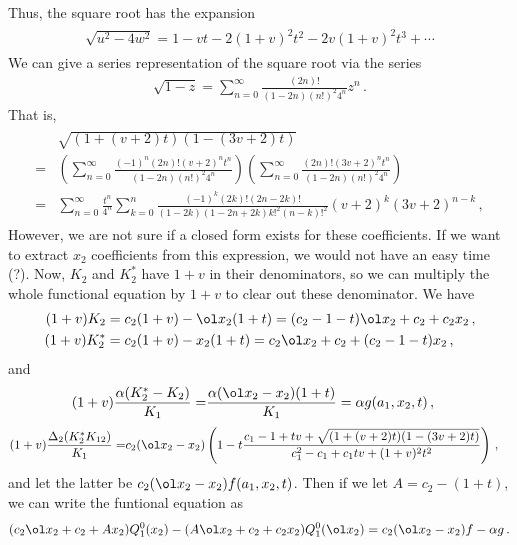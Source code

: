 Thus, the square root has the expansion
\begin{align}
\begin{split}
	\sqrt{u^2-4w^2} = 1 - vt-2(1+v)^2 t^2-2v(1+v)^2t^3+\cdots
\end{split}
\end{align}
We can give a series representation of the square root via the series
\begin{align}
	\sqrt{1-z} = \sum_{n=0}^\infty \frac{(2n)!}{(1-2n)(n!)^2 4^n}z^n\,.
\end{align}
That is,
\begin{align}
\begin{split}
	&\sqrt{(1+(v+2)t)(1-(3v+2)t)} \\=& \left(\sum_{n=0}^\infty \frac{(-1)^n(2n)!(v+2)^n t^n}{(1-2n)(n!)^2 4^n}\right)\left(\sum_{n=0}^\infty \frac{(2n)!(3v+2)^nt^n}{(1-2n)(n!)^2 4^n}\right)\\
	=& \sum_{n=0}^\infty \frac{t^n}{4^n}\sum_{k=0}^n \frac{(-1)^k(2k)!(2n-2k)!}{(1-2k)(1-2n+2k)k!^2 (n-k)!^2}(v+2)^k(3v+2)^{n-k}\,,
\end{split}
\end{align}
However, we are not sure if a closed form exists for these coefficients. If we want to extract $x_2$ coefficients from this expression, we would not have an easy time (?). Now, $K_2$ and $K_2^\ast$ have $1+v$ in their denominators, so we can multiply the whole functional equation by $1+v$ to clear out these denominator. We have
\begin{align}
	(1+v)K_2 &= c_2(1+v)-\ol x_2(1+t) = (c_2-1-t)\ol x_2+c_2+c_2x_2\,,\\
	(1+v)K_2^\ast &= c_2(1+v)-x_2(1+t) = c_2\ol x_2+c_2+(c_2-1-t)x_2\,,
\end{align}
and
\begin{align}
	(1+v)\frac{\alpha(K_2^\ast -K_2)}{K_1} = &\frac{\alpha (\ol x_2 - x_2)(1+t)}{K_1} = \alpha g(a_1,x_2,t)\,,
\end{align}
\begin{align}
\begin{split}
	(1+v)\frac{\Delta_2(K_2^\ast K_{12})}{K_1}=&c_2(\ol x_2-x_2)\left(1-t\frac{c_1-1+tv+\sqrt{(1+(v+2)t)(1-(3v+2)t)}}{c_1^2-c_1+c_1tv+(1+v)^2t^2}\right)\,,
\end{split}
\end{align}
and let the latter be $c_2(\ol x_2-x_2)f(a_1,x_2,t)$. Then if we let $A = c_2-(1+t)$, we can write the funtional equation as
\begin{align}
	(c_2\ol x_2+c_2+Ax_2)Q_1^0(x_2) - (A\ol x_2+c_2+c_2 x_2)Q_1^0(\ol x_2) = c_2(\ol x_2-x_2)f-\alpha g\,.
\end{align}
